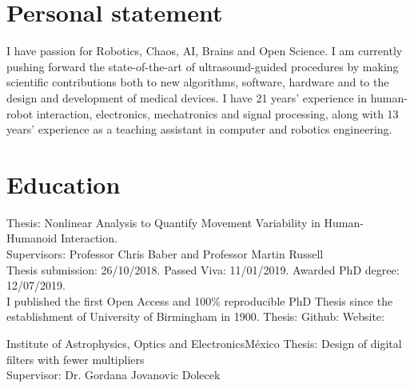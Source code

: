 \documentclass[10pt,a4paper,roman]{moderncv}
\begin{document}
\section{Personal statement}

\begin{changemargin}{10mm}{0.5cm}
I have passion for Robotics, Chaos, AI, Brains and Open Science.
I am currently pushing forward the state-of-the-art of 
ultrasound-guided procedures by making scientific contributions both
to new algorithms, software, hardware and 
to the design and development of medical devices.
I have 21 years' experience in human-robot interaction, 
electronics, mechatronics and signal processing, along 
with 13 years' experience as a teaching assistant in 
computer and robotics engineering. 
\end{changemargin}



\section{Education}
  {Thesis: Nonlinear Analysis to Quantify Movement Variability in Human-Humanoid Interaction.
	\\ Supervisors: Professor Chris Baber and  Professor Martin Russell
	\\ Thesis submission: 26/10/2018. Passed Viva: 11/01/2019. 
	Awarded PhD degree: 12/07/2019. \\
I published the first Open Access and 100\% 
reproducible PhD Thesis since the establishment of 
University of Birmingham in 1900.  
Thesis: \href{https://doi.org/10.5281/zenodo.3384145}{\faFilePdfO}
Github: \href{http://doi.org/10.5281/zenodo.3384281}{\faGithubAlt}
Website: \href{https://mxochicale-phd.github.io/site/}{\faExternalLink}
}

  {Institute of Astrophysics, Optics and Electronics}{M\'exico}{}
  {Thesis: Design of digital filters with fewer multipliers
  \href{https://github.com/mxochicale/publications/blob/master/thesis/M.Sc./doc/MPXochicale_MScThesis-2016.pdf}{\faFilePdfO}
  \href{https://github.com/mxochicale/publications/tree/master/thesis/M.Sc.}{\faGithubAlt}
  \\ Supervisor: Dr. Gordana Jovanovic Dolecek}
\end{document}
